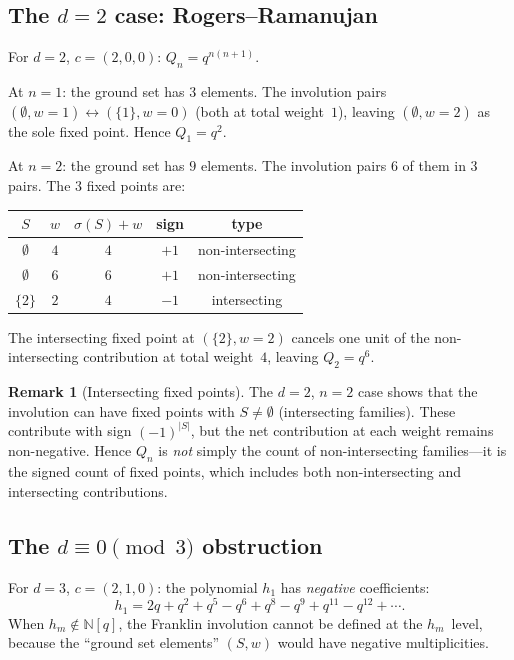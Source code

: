 \documentclass[11pt]{article}
\newcommand{\N}{\mathbb{N}}
\theoremstyle{plain}
\theoremstyle{definition}
\newtheorem{remark}[theorem]{Remark}
\begin{document}
\subsection{The $d = 2$ case: Rogers--Ramanujan}

For $d = 2$, $c = (2,0,0)$: $Q_n = q^{n(n+1)}$.

At $n = 1$: the ground set has $3$ elements.  The
involution pairs
$(\emptyset, w{=}1) \leftrightarrow (\{1\}, w{=}0)$
(both at total weight~$1$), leaving $(\emptyset, w{=}2)$
as the sole fixed point.  Hence $Q_1 = q^2$.

At $n = 2$: the ground set has $9$ elements.  The
involution pairs $6$ of them in $3$ pairs.  The $3$
fixed points are:
\begin{center}
\begin{tabular}{c|c|c|c|c}
$S$ & $w$ & $\sigma(S) + w$ & sign & type \\ \hline
$\emptyset$ & $4$ & $4$ & $+1$ & non-intersecting \\
$\emptyset$ & $6$ & $6$ & $+1$ & non-intersecting \\
$\{2\}$ & $2$ & $4$ & $-1$ & intersecting \\
\end{tabular}
\end{center}
The intersecting fixed point at $(\{2\}, w{=}2)$
cancels one unit of the non-intersecting contribution
at total weight~$4$, leaving $Q_2 = q^6$.

\begin{remark}[Intersecting fixed points]
\label{rem:intersecting-fp}
The $d = 2$, $n = 2$ case shows that the involution
can have fixed points with $S \neq \emptyset$
(intersecting families).  These contribute with sign
$(-1)^{|S|}$, but the net contribution at each weight
remains non-negative.  Hence $Q_n$ is \emph{not}
simply the count of non-intersecting families---it is
the signed count of fixed points, which includes both
non-intersecting and intersecting contributions.
\end{remark}


\subsection{The $d \equiv 0 \pmod{3}$ obstruction}

For $d = 3$, $c = (2,1,0)$: the polynomial $h_1$ has
\emph{negative} coefficients:
\[
  h_1 = 2q + q^2 + q^5 - q^6 + q^8 - q^9
    + q^{11} - q^{12} + \cdots.
\]
When $h_m \notin \N[q]$, the Franklin involution cannot
be defined at the $h_m$~level, because the ``ground set
elements'' $(S, w)$ would have negative multiplicities.
\end{document}

